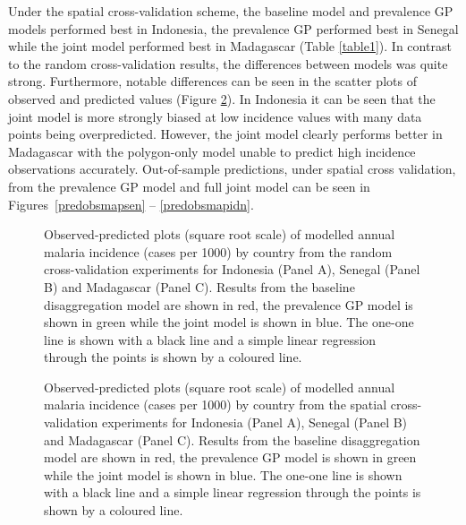 \documentclass{statsoc}
\begin{document}

Under the spatial cross-validation scheme, the baseline model and prevalence GP models performed best in Indonesia, the prevalence GP performed best in Senegal while the joint model performed best in Madagascar (Table \ref{table1}).
In contrast to the random cross-validation results, the differences between models was quite strong.
Furthermore, notable differences can be seen in the scatter plots of observed and predicted values (Figure \ref{spatial2predobspolyfacet}).
In Indonesia it can be seen that the joint model is more strongly biased at low incidence values with many data points being overpredicted.
However, the joint model clearly performs better in Madagascar with the polygon-only model unable to predict high incidence observations accurately.
Out-of-sample predictions, under spatial cross validation, from the prevalence GP model and full joint model can be seen in Figures~\ref{predobsmapsen} -- \ref{predobsmapidn}.

\begin{figure}
\caption{\label{randompredobspolyfacet} 
Observed-predicted plots (square root scale) of modelled annual malaria incidence (cases per 1000) by country from the random cross-validation experiments for Indonesia (Panel A), Senegal (Panel B) and Madagascar (Panel C). 
Results from the baseline disaggregation model are shown in red, the prevalence GP model is shown in green while the joint model is shown in blue.
The one-one line is shown with a black line and a simple linear regression through the points is shown by a coloured line.
}

\end{figure}




\begin{figure}
\caption{\label{spatial2predobspolyfacet} 
Observed-predicted plots (square root scale) of modelled annual malaria incidence (cases per 1000) by country from the spatial cross-validation experiments for Indonesia (Panel A), Senegal (Panel B) and Madagascar (Panel C). 
Results from the baseline disaggregation model are shown in red, the prevalence GP model is shown in green while the joint model is shown in blue.
The one-one line is shown with a black line and a simple linear regression through the points is shown by a coloured line.
}

\end{figure}
\end{document}
